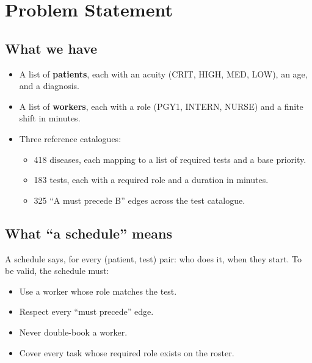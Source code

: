 \section{Problem Statement}
\label{sec:problem}

\subsection{What we have}

\begin{itemize}
  \item A list of \textbf{patients}, each with an acuity (CRIT,
        HIGH, MED, LOW), an age, and a diagnosis.
  \item A list of \textbf{workers}, each with a role (PGY1, INTERN,
        NURSE) and a finite shift in minutes.
  \item Three reference catalogues:
        \begin{itemize}
          \item 418 diseases, each mapping to a list of required
                tests and a base priority.
          \item 183 tests, each with a required role and a
                duration in minutes.
          \item 325 ``A must precede B'' edges across the test
                catalogue.
        \end{itemize}
\end{itemize}

\subsection{What ``a schedule'' means}

A schedule says, for every (patient, test) pair: who does it, when
they start. To be valid, the schedule must:

\begin{itemize}
  \item Use a worker whose role matches the test.
  \item Respect every ``must precede'' edge.
  \item Never double-book a worker.
  \item Cover every task whose required role exists on the roster.
\end{itemize}

